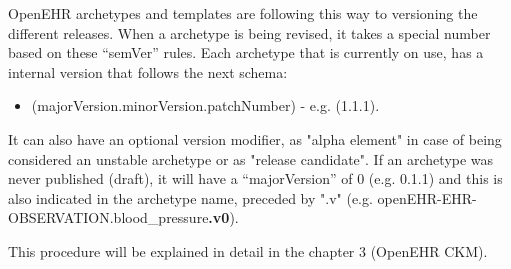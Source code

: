 \documentclass[mim_thesis.tex]{subfiles}
\begin{document}
OpenEHR archetypes and templates are following this way to versioning the different releases. When a archetype is being revised, it takes a special number based on these “semVer” rules. Each archetype that is currently on use, has a internal version that follows the next schema:
\begin{itemize} [noitemsep]
\item (majorVersion.minorVersion.patchNumber) - e.g. (1.1.1).
\end{itemize}

It can also have an optional version modifier, as "alpha element" in case of being considered an unstable archetype or as "release candidate". If an archetype was never published (draft), it will have a “majorVersion” of 0 (e.g. 0.1.1) and this is also indicated in the archetype name, preceded by ".v" (e.g. openEHR-EHR-OBSERVATION.blood\_pressure\textbf{.v0}). \citep{openEHRCKM}

This procedure will be explained in detail in the chapter 3 (OpenEHR CKM).  


\newpage
\end{document}
